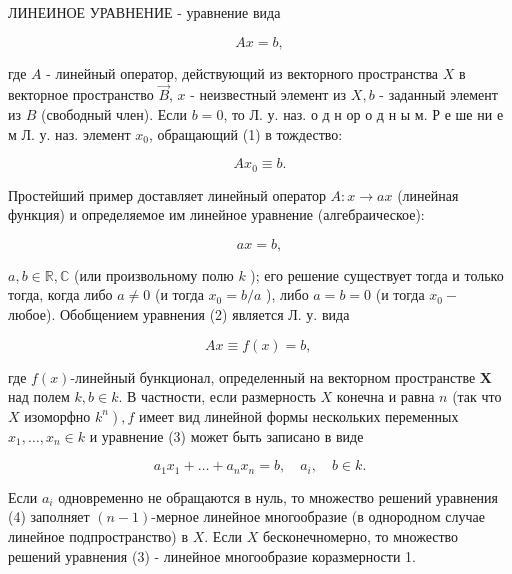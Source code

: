 \documentclass[10pt]{article}
\begin{document}
ЛИНЕИНОЕ УРАВНЕНИЕ - уравнение вида



\[

A x=b,

\]



где $A$ - линейный оператор, действующий из векторного пространства $X$ в векторное пространство $\vec{B}$, $x$ - неизвестный элемент из $X, b$ - заданный элемент из $B$ (свободный член). Если $b=0$, то Л. у. наз. о д н ор о д н ы м. Р е ше ни е м Л. у. наз. элемент $x_{0}$, обращающий (1) в тождество:



\[

A x_{0} \equiv b .

\]



Простейший пример доставляет линейный оператор $A: x \rightarrow a x$ (линейная функция) и определяемое им линейное уравнение (алгебраическое):



\[

a x=b,

\]



$a, b \in \mathbb{R}, \mathbb{C}$ (или произвольному полю $k$ ); его решение существует тогда и только тогда, когда либо $a \neq 0$ (и тогда $x_{0}=b / a$ ), либо $a=b=0$ (и тогда $x_{0}-$ любое). Обобщением уравнения (2) является Л. у. вида



\[

A x \equiv f(x)=b \text {, }

\]



где $f(x)$-линейный бункционал, определенный на векторном пространстве $\boldsymbol{X}$ над полем $k, b \in k$. В частности, если размерность $X$ конечна и равна $n$ (так что $X$ изоморфно $\left.k^{n}\right), f$ имеет вид линейной формы нескольких переменных $x_{1}, \ldots, x_{n} \in k$ и уравнение (3) может быть записано в виде



\[

a_{1} x_{1}+\ldots+a_{n} x_{n}=b, \quad a_{i}, \quad b \in k .

\]



Если $a_{i}$ одновременно не обращаются в нуль, то множество решений уравнения (4) заполняет $(n-1)$-мерное линейное многообразие (в однородном случае линейное подпространство) в $X$. Если $X$ бесконечномерно, то множество решений уравнения (3) - линейное многообразие коразмерности 1.
\end{document}
